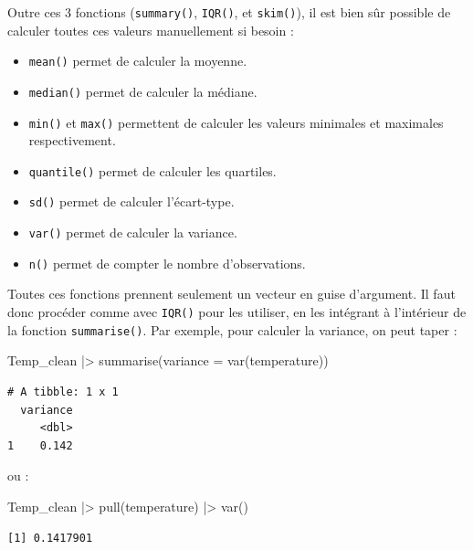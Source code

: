 \documentclass[
  french,
  a4paper,
  DIV=11,
  numbers=noendperiod,
  oneside]{scrreprt}
\newenvironment{Shaded}{}{}
\newcommand{\AttributeTok}[1]{\textcolor[rgb]{0.84,0.23,0.29}{#1}}
\newcommand{\FunctionTok}[1]{\textcolor[rgb]{0.44,0.26,0.76}{#1}}
\newcommand{\NormalTok}[1]{\textcolor[rgb]{0.14,0.16,0.18}{#1}}
\newcommand{\SpecialCharTok}[1]{\textcolor[rgb]{0.00,0.36,0.77}{#1}}
\providecommand{\tightlist}{%
  \setlength{\itemsep}{0pt}\setlength{\parskip}{0pt}}
\begin{document}
Outre ces 3 fonctions (\texttt{summary()}, \texttt{IQR()}, et
\texttt{skim()}), il est bien sûr possible de calculer toutes ces
valeurs manuellement si besoin :

\begin{itemize}
\tightlist
\item
  \texttt{mean()} permet de calculer la moyenne.
\item
  \texttt{median()} permet de calculer la médiane.
\item
  \texttt{min()} et \texttt{max()} permettent de calculer les valeurs
  minimales et maximales respectivement.
\item
  \texttt{quantile()} permet de calculer les quartiles.
\item
  \texttt{sd()} permet de calculer l'écart-type.
\item
  \texttt{var()} permet de calculer la variance.
\item
  \texttt{n()} permet de compter le nombre d'observations.
\end{itemize}

Toutes ces fonctions prennent seulement un vecteur en guise d'argument.
Il faut donc procéder comme avec \texttt{IQR()} pour les utiliser, en
les intégrant à l'intérieur de la fonction \texttt{summarise()}. Par
exemple, pour calculer la variance, on peut taper :

\begin{Shaded}
\begin{Highlighting}[]
\NormalTok{Temp\_clean }\SpecialCharTok{|\textgreater{}} 
  \FunctionTok{summarise}\NormalTok{(}\AttributeTok{variance =} \FunctionTok{var}\NormalTok{(temperature))}
\end{Highlighting}
\end{Shaded}

\begin{verbatim}
# A tibble: 1 x 1
  variance
     <dbl>
1    0.142
\end{verbatim}

ou :

\begin{Shaded}
\begin{Highlighting}[]
\NormalTok{Temp\_clean }\SpecialCharTok{|\textgreater{}}
  \FunctionTok{pull}\NormalTok{(temperature) }\SpecialCharTok{|\textgreater{}}
  \FunctionTok{var}\NormalTok{()}
\end{Highlighting}
\end{Shaded}

\begin{verbatim}
[1] 0.1417901
\end{verbatim}
\end{document}
